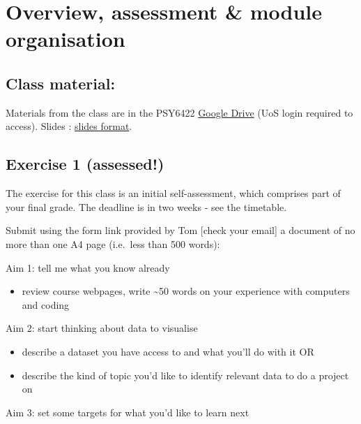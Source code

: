 \documentclass[
]{book}
\providecommand{\tightlist}{%
  \setlength{\itemsep}{0pt}\setlength{\parskip}{0pt}}
\begin{document}
\hypertarget{overview-assessment-module-organisation}{%
\chapter{Overview, assessment \& module organisation}\label{overview-assessment-module-organisation}}

\hypertarget{class-material}{%
\section{Class material:}\label{class-material}}

Materials from the class are in the PSY6422 \href{https://drive.google.com/drive/folders/1sDmbrTfKpiz2Y02R17ajLPkJV1XSxvJD?usp=sharing}{Google Drive} (UoS login required to access). Slides : \href{https://docs.google.com/presentation/d/15RlRzRGL3fa1SckE8YUWhJxiuWf5GH5pssIcG2zStKM/edit?usp=sharing}{slides format}.

\hypertarget{exercise-1-assessed}{%
\section{Exercise 1 (assessed!)}\label{exercise-1-assessed}}

The exercise for this class is an initial self-assessment, which comprises part of your final grade. The deadline is in two weeks - see the timetable.

Submit using the form link provided by Tom {[}check your email{]} a document of no more than one A4 page (i.e.~less than 500 words):

Aim 1: tell me what you know already

\begin{itemize}
\tightlist
\item
  review course webpages, write \textasciitilde50 words on your experience with computers and coding
\end{itemize}

Aim 2: start thinking about data to visualise

\begin{itemize}
\tightlist
\item
  describe a dataset you have access to and what you'll do with it OR\\
\item
  describe the kind of topic you'd like to identify relevant data to do a project on
\end{itemize}

Aim 3: set some targets for what you'd like to learn next
\end{document}
